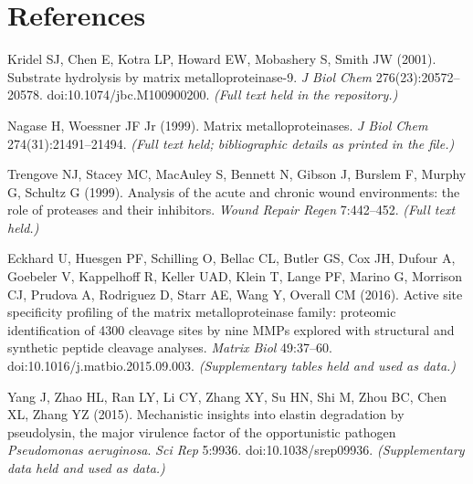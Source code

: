 \section*{References}
\small
\begin{enumerate}[label={[\arabic*]},leftmargin=*,itemsep=0.25em]
\item Kridel SJ, Chen E, Kotra LP, Howard EW, Mobashery S, Smith JW (2001). Substrate hydrolysis by matrix metalloproteinase-9. \textit{J Biol Chem} 276(23):20572--20578. doi:10.1074/jbc.M100900200. \emph{(Full text held in the repository.)}
\item Nagase H, Woessner JF Jr (1999). Matrix metalloproteinases. \textit{J Biol Chem} 274(31):21491--21494. \emph{(Full text held; bibliographic details as printed in the file.)}
\item Trengove NJ, Stacey MC, MacAuley S, Bennett N, Gibson J, Burslem F, Murphy G, Schultz G (1999). Analysis of the acute and chronic wound environments: the role of proteases and their inhibitors. \textit{Wound Repair Regen} 7:442--452. \emph{(Full text held.)}
\item Eckhard U, Huesgen PF, Schilling O, Bellac CL, Butler GS, Cox JH, Dufour A, Goebeler V, Kappelhoff R, Keller UAD, Klein T, Lange PF, Marino G, Morrison CJ, Prudova A, Rodriguez D, Starr AE, Wang Y, Overall CM (2016). Active site specificity profiling of the matrix metalloproteinase family: proteomic identification of 4300 cleavage sites by nine MMPs explored with structural and synthetic peptide cleavage analyses. \textit{Matrix Biol} 49:37--60. doi:10.1016/j.matbio.2015.09.003. \emph{(Supplementary tables held and used as data.)}
\item Yang J, Zhao HL, Ran LY, Li CY, Zhang XY, Su HN, Shi M, Zhou BC, Chen XL, Zhang YZ (2015). Mechanistic insights into elastin degradation by pseudolysin, the major virulence factor of the opportunistic pathogen \emph{Pseudomonas aeruginosa}. \textit{Sci Rep} 5:9936. doi:10.1038/srep09936. \emph{(Supplementary data held and used as data.)}
\end{enumerate}

